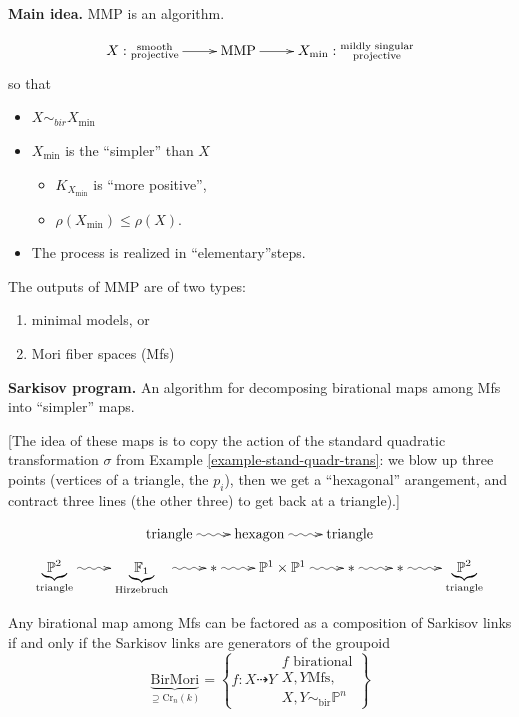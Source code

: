 \noindent
\textbf{Main idea.}
MMP is an algorithm.

$$
\xymatrix{
X:\substack{\text{smooth} \\
\text{projective}}
\ar[r]
&  \text{MMP}
\ar[r]
&  X_{\text{min}}: \substack{\text{mildly
singular} \\ \text{projective}}
}
$$
so that
\begin{itemize}
\item  $X \sim_{bir} X_{\text{min}}$
\item $X_{\text{min}}$ is the ``simpler''
than $X$
\begin{itemize}
\item $K_{X_{\text{min}}}$ is ``more
positive'',
\item $\rho(X_{\text{min}}) \leq  \rho(X)$.
\end{itemize}
\item The process is realized in
``elementary''steps.
\end{itemize}

\noindent
The outputs of MMP
are of two types:
\begin{enumerate}
\item minimal models, or
\item Mori fiber spaces (Mfs)
\end{enumerate}

\medskip\noindent
\textbf{Sarkisov program.}
An algorithm for decomposing birational maps
among Mfs into ``simpler'' maps.

[The idea of these maps is to copy the action
of
the standard quadratic transformation
$\sigma$
from Example \ref{example-stand-quadr-trans}:
we blow up three points (vertices of a
triangle, the $p_i$),
then we get a ``hexagonal'' arangement,
and contract three lines (the other three)
to get back at a triangle).]

$$
\xymatrix{
\text{triangle}\ar@{~>}[r]
&\text{hexagon}\ar@{~>}[r]
&\text{triangle}
}
$$
$$
\xymatrix{
\underbrace{\mathbb{P}^2}_{\text{triangle}}
\ar@{~>}[r]
&\underbrace{\mathbb{F}_1}_{\text{Hirzebruch}
}
\ar@{~>}[r]
&\ast
\ar@{~>}[r]
&\mathbb{P}^1 \times \mathbb{P}^1
\ar@{~>}[r]
&\ast
\ar@{~>}[r]
&\ast
\ar@{~>}[r]
&\underbrace{\mathbb{P}^2}_{\text{triangle}}
}
$$

\begin{theorem}
\label{theorem-corcb-hacon-mckeman}
Any birational map among Mfs can be factored
as
a composition of Sarkisov links
if and only if
the Sarkisov links are generators of the
groupoid
$$
\underbrace{\text{BirMori}
}_{\supseteq \text{Cr}_n(k)}
=\left\{f:X\dashrightarrow Y
\substack{f\text{ birational} \\ X,Y\text{
Mfs,}\\
X,Y \sim_{\text{bir}}\mathbb{P}^n}\right\}
$$
\end{theorem}

